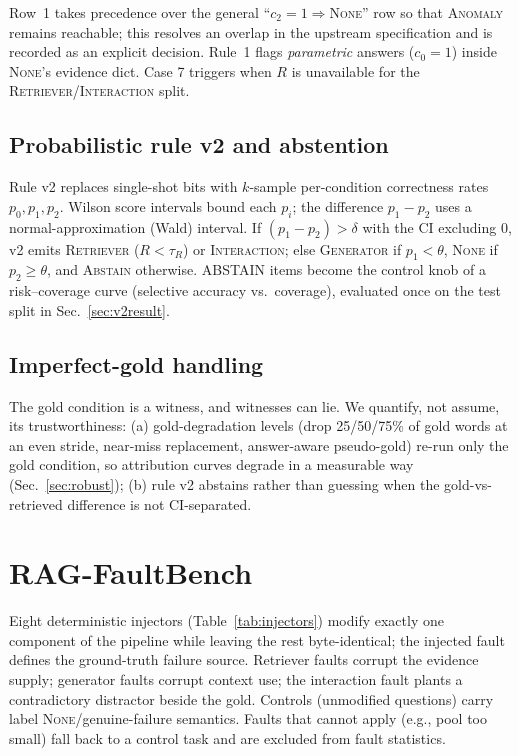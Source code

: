 \documentclass[conference]{IEEEtran}
\begin{document}
Row~1 takes precedence over the general ``$c_2{=}1\Rightarrow$\textsc{None}''
row so that \textsc{Anomaly} remains reachable; this resolves an overlap in
the upstream specification and is recorded as an explicit decision. Rule~1
flags \emph{parametric} answers ($c_0{=}1$) inside \textsc{None}'s evidence
dict. Case 7 triggers when $R$ is unavailable for the
\textsc{Retriever}/\textsc{Interaction} split.

\subsection{Probabilistic rule v2 and abstention}
Rule v2 replaces single-shot bits with $k$-sample per-condition correctness
rates $p_0,p_1,p_2$. Wilson score intervals bound each $p_i$; the
difference $p_1-p_2$ uses a normal-approximation (Wald) interval. If
$(p_1-p_2)>\delta$ with the CI excluding 0, v2 emits \textsc{Retriever}
($R<\tau_R$) or \textsc{Interaction}; else \textsc{Generator} if
$p_1<\theta$, \textsc{None} if $p_2\ge\theta$, and \textsc{Abstain}
otherwise. ABSTAIN items become the control knob of a risk--coverage curve
(selective accuracy vs.\ coverage), evaluated once on the test split in
Sec.~\ref{sec:v2result}.

\subsection{Imperfect-gold handling}
The gold condition is a witness, and witnesses can lie. We quantify, not
assume, its trustworthiness: (a) gold-degradation levels (drop 25/50/75\% of
gold words at an even stride, near-miss replacement, answer-aware
pseudo-gold) re-run only the gold condition, so attribution curves degrade
in a measurable way (Sec.~\ref{sec:robust}); (b) rule v2 abstains rather
than guessing when the gold-vs-retrieved difference is not CI-separated.

\section{RAG-FaultBench}
\label{sec:bench}
Eight deterministic injectors (Table~\ref{tab:injectors}) modify exactly one
component of the pipeline while leaving the rest byte-identical; the
injected fault defines the ground-truth failure source. Retriever faults
corrupt the evidence supply; generator faults corrupt context use; the
interaction fault plants a contradictory distractor beside the gold.
Controls (unmodified questions) carry label \textsc{None}/genuine-failure
semantics. Faults that cannot apply (e.g., pool too small) fall back to a
control task and are excluded from fault statistics.
\end{document}
